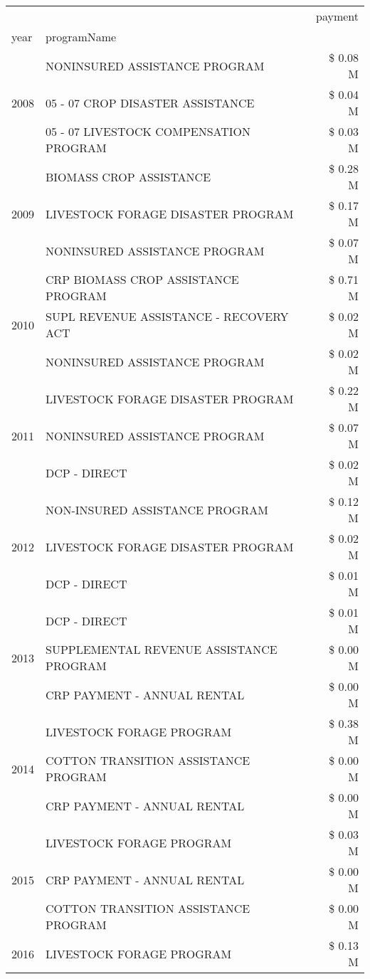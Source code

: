 \begin{tabular}{llr}
\toprule
 &  & payment \\
year & programName &  \\
\midrule
\multirow[t]{3}{*}{2008} & NONINSURED ASSISTANCE PROGRAM & \$ 0.08 M \\
 & 05 - 07 CROP DISASTER ASSISTANCE & \$ 0.04 M \\
 & 05 - 07 LIVESTOCK COMPENSATION PROGRAM & \$ 0.03 M \\
\cline{1-3}
\multirow[t]{3}{*}{2009} & BIOMASS CROP ASSISTANCE & \$ 0.28 M \\
 & LIVESTOCK FORAGE DISASTER  PROGRAM & \$ 0.17 M \\
 & NONINSURED ASSISTANCE PROGRAM & \$ 0.07 M \\
\cline{1-3}
\multirow[t]{3}{*}{2010} & CRP BIOMASS CROP ASSISTANCE PROGRAM & \$ 0.71 M \\
 & SUPL REVENUE ASSISTANCE - RECOVERY ACT & \$ 0.02 M \\
 & NONINSURED ASSISTANCE PROGRAM & \$ 0.02 M \\
\cline{1-3}
\multirow[t]{3}{*}{2011} & LIVESTOCK FORAGE DISASTER PROGRAM & \$ 0.22 M \\
 & NONINSURED ASSISTANCE PROGRAM & \$ 0.07 M \\
 & DCP - DIRECT & \$ 0.02 M \\
\cline{1-3}
\multirow[t]{3}{*}{2012} & NON-INSURED ASSISTANCE PROGRAM & \$ 0.12 M \\
 & LIVESTOCK FORAGE DISASTER PROGRAM & \$ 0.02 M \\
 & DCP - DIRECT & \$ 0.01 M \\
\cline{1-3}
\multirow[t]{3}{*}{2013} & DCP - DIRECT & \$ 0.01 M \\
 & SUPPLEMENTAL REVENUE ASSISTANCE PROGRAM & \$ 0.00 M \\
 & CRP PAYMENT - ANNUAL RENTAL & \$ 0.00 M \\
\cline{1-3}
\multirow[t]{3}{*}{2014} & LIVESTOCK FORAGE PROGRAM & \$ 0.38 M \\
 & COTTON TRANSITION ASSISTANCE PROGRAM & \$ 0.00 M \\
 & CRP PAYMENT - ANNUAL RENTAL & \$ 0.00 M \\
\cline{1-3}
\multirow[t]{3}{*}{2015} & LIVESTOCK FORAGE PROGRAM & \$ 0.03 M \\
 & CRP PAYMENT - ANNUAL RENTAL & \$ 0.00 M \\
 & COTTON TRANSITION ASSISTANCE PROGRAM & \$ 0.00 M \\
\cline{1-3}
\multirow[t]{3}{*}{2016} & LIVESTOCK FORAGE PROGRAM & \$ 0.13 M \\

\end{tabular}
